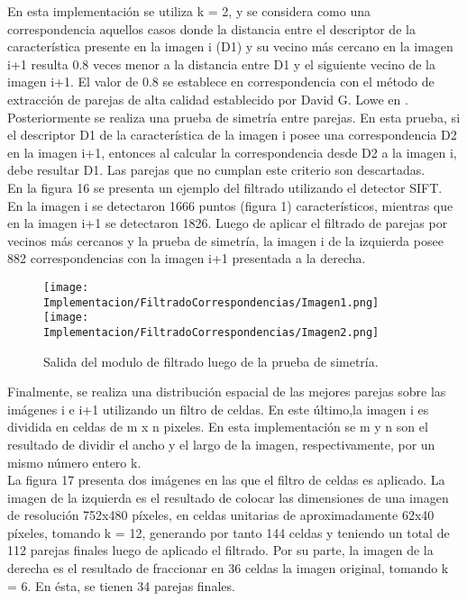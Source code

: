 En esta implementación se utiliza k = 2, y se considera como una correspondencia aquellos casos donde la distancia entre el descriptor de la característica presente en la imagen i (D1) y su vecino más cercano en la imagen i+1 resulta 0.8 veces menor a la distancia entre D1 y el siguiente vecino de la imagen i+1. El valor de 0.8 se establece en correspondencia con el método de extracción de parejas de alta calidad establecido por David G. Lowe en \cite{1}.\\

Posteriormente se realiza una prueba de simetría entre parejas. En esta prueba, si el descriptor D1 de la característica  de la imagen i posee una correspondencia D2 en la imagen i+1, entonces al calcular la correspondencia desde D2 a la imagen i, debe resultar D1. Las parejas que no cumplan este criterio son descartadas.\\

En la figura 16 se presenta un ejemplo del filtrado  utilizando el detector SIFT. En la imagen i se detectaron 1666 puntos (figura 1) característicos, mientras que en la imagen i+1 se detectaron 1826. Luego de aplicar el filtrado de parejas por vecinos más cercanos y la prueba de simetría, la imagen i de la izquierda posee 882 correspondencias con la imagen i+1 presentada a la derecha.\\

\begin{figure}[H]
	
	\texttt{[image: Implementacion/FiltradoCorrespondencias/Imagen1.png]}
	\texttt{[image: Implementacion/FiltradoCorrespondencias/Imagen2.png]}
	\caption{Salida del modulo de filtrado luego de la prueba de simetría.}
	\label{fig:my_label}
\end{figure}


Finalmente, se realiza una distribución espacial de las mejores parejas  sobre las imágenes i e i+1 utilizando un filtro de celdas. En este último,la imagen i es dividida en celdas de m x n pixeles. En esta implementación se m y n son el resultado de dividir el ancho y el largo de la imagen, respectivamente, por un mismo número entero k. \\

La figura 17 presenta dos imágenes en las que el filtro de celdas es aplicado. La imagen de la izquierda es el resultado de colocar las dimensiones de una imagen de resolución 752x480 píxeles, en celdas unitarias de aproximadamente 62x40 píxeles,
tomando k = 12,  generando por tanto 144 celdas y teniendo un total de 112 parejas finales luego de aplicado el filtrado. Por su parte, la imagen de la derecha es el resultado de fraccionar en 36 celdas la imagen original, tomando k = 6. En ésta, se tienen 34 parejas finales. \\


